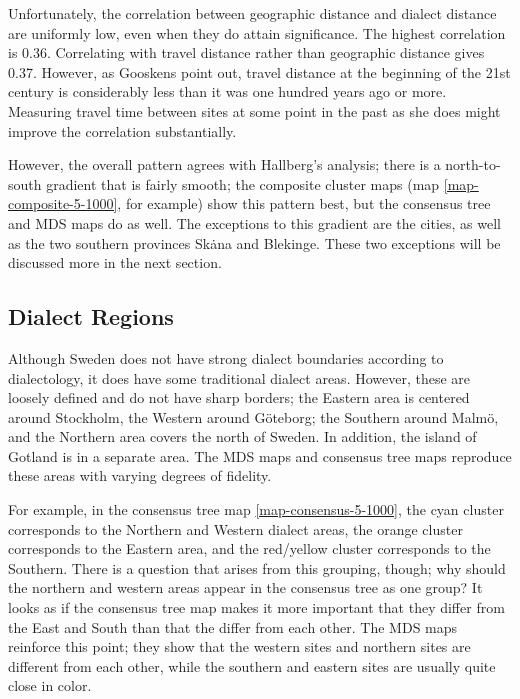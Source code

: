 Unfortunately, the correlation between geographic distance and dialect
distance are uniformly low, even when they do attain significance. The
highest correlation is 0.36. Correlating with travel distance rather
than geographic distance gives 0.37. However, as Gooskens point out, travel
distance at the beginning of the 21st century is considerably less
than it was one hundred years ago or more. Measuring travel time
between sites at some point in the past as she does might improve the
correlation substantially.

However, the overall pattern agrees with Hallberg's analysis; there is
a north-to-south gradient that is fairly smooth; the composite cluster
maps (map \ref{map-composite-5-1000}, for example) show this pattern
best, but the consensus tree and MDS maps do as well. The exceptions
to this gradient are the cities, as well as the two southern provinces
Sk\.ana and Blekinge. These two exceptions will be discussed more in
the next section.

\subsection{Dialect Regions}

Although Sweden does not have strong dialect boundaries according to
dialectology, it does have some traditional dialect areas. However,
these are loosely defined and do not have sharp borders; the Eastern
area is centered around Stockholm, the Western around G\"oteborg; the
Southern around Malm\"o, and the Northern area covers the north of
Sweden. In addition, the island of Gotland is in a separate area. The
MDS maps and consensus tree maps reproduce these areas with varying
degrees of fidelity.

For example, in the consensus tree map \ref{map-consensus-5-1000}, the
cyan cluster corresponds to the Northern and Western dialect areas,
the orange cluster corresponds to the Eastern area, and the red/yellow
cluster corresponds to the Southern. There is a question that arises
from this grouping, though; why should the northern and western areas
appear in the consensus tree as one group? It looks as if the
consensus tree map makes it more important that they differ from the
East and South than that the differ from each other. The MDS maps
reinforce this point; they show that the western sites and northern sites
are different from each other, while the southern and eastern sites
are usually quite close in color.

